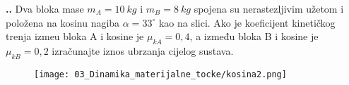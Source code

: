 

\noindent 
\textbf{
\thecjelina.\thezadatak.}
Dva bloka mase $m_A = 10\ kg$ i $m_B = 8\ kg$ spojena su nerastezljivim užetom i položena na kosinu
nagiba $\alpha = 33^\circ$ kao na slici. Ako je koeficijent kineti\v{c}kog trenja izme\dj{}u bloka A i kosine je 
$\mu_{kA} = 0,4$,
a između bloka B i kosine je $\mu_{kB} = 0,2$ izra\v{c}unajte iznos ubrzanja cijelog sustava.
\begin{figure}[h]%
  \begin{center}
    \texttt{[image: 03\_Dinamika\_materijalne\_tocke/kosina2.png]}
  \end{center}
\end{figure}

